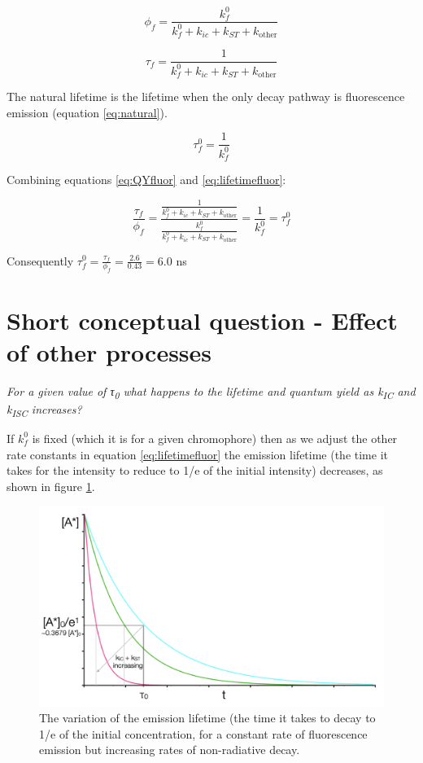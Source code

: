 \documentclass[
]{book}
\begin{document}
\begin{equation}
\phi_f = \frac{k_f^0}{k_f^0+k_{ic}+ k_{ST}+k_{\textrm{other}}}
\label{eq:QYfluor}
\end{equation}

\begin{equation}
\tau_f = \frac{1}{k_f^0+k_{ic}+ k_{ST}+k_{\textrm{other}}}
\label{eq:lifetimefluor}
\end{equation}

The natural lifetime is the lifetime when the only decay pathway is fluorescence emission (equation \eqref{eq:natural}).

\begin{equation}
\tau_f^0 = \frac{1}{k_f^0}
\label{eq:natural}
\end{equation}

Combining equations \eqref{eq:QYfluor} and \eqref{eq:lifetimefluor}:

\begin{equation*}
\frac{\tau_f}{\phi_f}=\frac{\frac{1}{k_f^0+k_{ic}+ k_{ST}+k_{\textrm{other}}}}{\frac{k_f^0}{k_f^0+k_{ic}+ k_{ST}+k_{\textrm{other}}}}=\frac{1}{k_f^0}=\tau_f^0
\end{equation*}

Consequently \(\tau_f^0 = \frac{\tau_f}{\phi_f}=\frac{2.6}{0.43}= 6.0\) ns

\hypertarget{sec:otherprocesses}{%
\section{Short conceptual question - Effect of other processes}\label{sec:otherprocesses}}

\emph{For a given value of τ\textsubscript{0} what happens to the lifetime and quantum yield as k\textsubscript{IC} and k\textsubscript{ISC} increases?}

If \(k_f^0\) is fixed (which it is for a given chromophore) then as we adjust the other rate constants in equation \eqref{eq:lifetimefluor} the emission lifetime (the time it takes for the intensity to reduce to 1/e of the initial intensity) decreases, as shown in figure \ref{fig:rateslifetime}.

\begin{figure}

{\centering \includegraphics[width=0.7\linewidth]{images/rateslifetime} 

}

\caption{The variation of the emission lifetime (the time it takes to decay to 1/e of the initial concentration, for a constant rate of fluorescence emission but increasing rates of non-radiative decay.}\label{fig:rateslifetime}
\end{figure}
\end{document}
